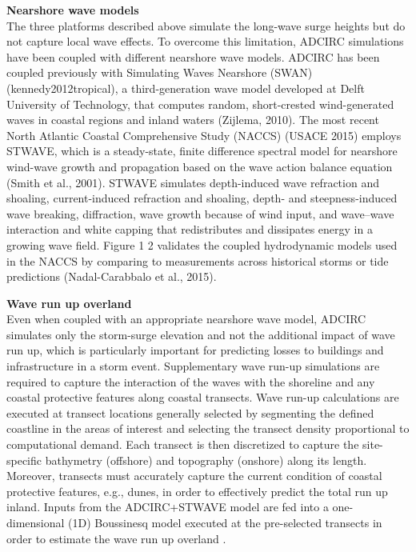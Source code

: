 \noindent\textbf{Nearshore wave models} \\The three platforms described above simulate the long-wave surge heights but do not capture local wave effects. To overcome this limitation, ADCIRC simulations have been coupled with different nearshore wave models. ADCIRC has been coupled previously with Simulating Waves Nearshore (SWAN) (kennedy2012tropical), a third-generation wave model developed at Delft University of Technology, that computes random, short-crested wind-generated waves in coastal regions and inland waters (Zijlema, 2010). The most recent North Atlantic Coastal Comprehensive Study (NACCS) (USACE 2015) employs STWAVE, which is a steady-state, finite difference spectral model for nearshore wind-wave growth and propagation based on the wave action balance equation (Smith et al., 2001). STWAVE simulates depth-induced wave refraction and shoaling, current-induced refraction and shoaling, depth- and steepness-induced wave breaking, diffraction, wave growth because of wind input, and wave–wave interaction and white capping that redistributes and dissipates energy in a growing wave field. Figure 1 2 validates the coupled hydrodynamic models used in the NACCS by comparing to measurements across historical storms or tide predictions (Nadal-Carabbalo et al., 2015). 
\newline

\noindent\textbf{Wave run up overland} \\Even when coupled with an appropriate nearshore wave model, ADCIRC simulates only the storm-surge elevation and not the additional impact of wave run up, which is particularly important for predicting losses to buildings and infrastructure in a storm event. Supplementary wave run-up simulations are required to capture the interaction of the waves with the shoreline and any coastal protective features along coastal transects. Wave run-up calculations are executed at transect locations generally selected by segmenting the defined coastline in the areas of interest and selecting the transect density proportional to computational demand. Each transect is then discretized to capture the site-specific bathymetry (offshore) and topography (onshore) along its length. Moreover, transects must accurately capture the current condition of coastal protective features, e.g., dunes, in order to effectively predict the total run up inland. Inputs from the ADCIRC+STWAVE model are fed into a one-dimensional (1D) Boussinesq model executed at the pre-selected transects in order to estimate the wave run up overland \citep{demirbilek_2009}. 
\newline

